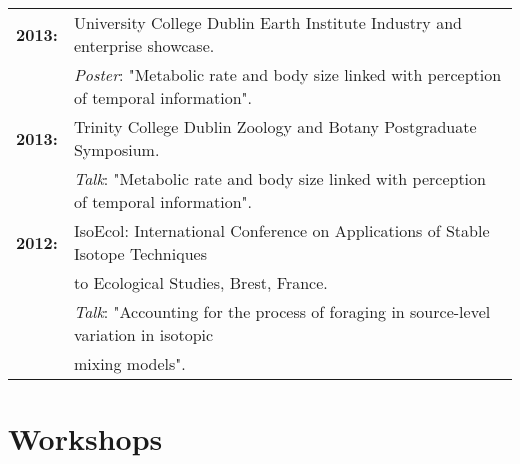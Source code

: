\documentclass[10pt,a4paper]{article}
\begin{document}
\begin{tabular}{ll}
\textbf{2013:} & University College Dublin Earth Institute Industry and enterprise showcase.\\
&\textsl{Poster}: "Metabolic rate and body size linked with perception of temporal information".\\
\textbf{2013:} & Trinity College Dublin Zoology and Botany Postgraduate Symposium.\\
&\textsl{Talk}: "Metabolic rate and body size linked with perception of temporal information".\\
\textbf{2012:} & IsoEcol: International Conference on Applications of Stable Isotope Techniques\\
&to Ecological Studies, Brest, France.\\
 &\textsl{Talk}: "Accounting for the process of foraging in source-level variation in isotopic\\
& mixing models".\\


\end{tabular}
\bigskip

\section{Workshops}
\end{document}
